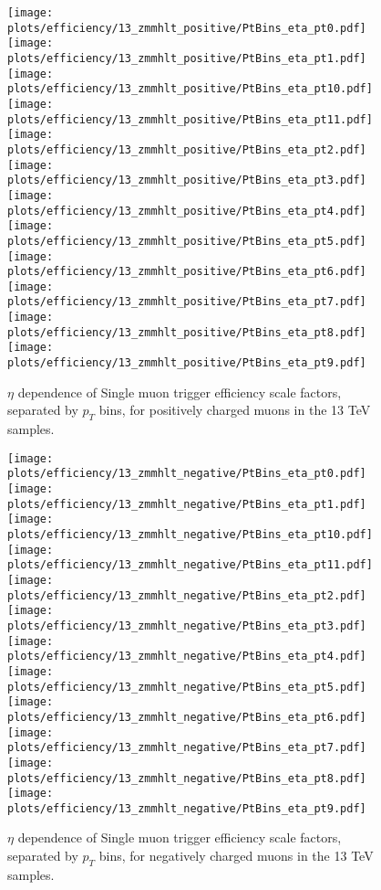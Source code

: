 \begin{figure}
\centering
\texttt{[image: plots/efficiency/13\_zmmhlt\_positive/PtBins\_eta\_pt0.pdf]}
\texttt{[image: plots/efficiency/13\_zmmhlt\_positive/PtBins\_eta\_pt1.pdf]}
\texttt{[image: plots/efficiency/13\_zmmhlt\_positive/PtBins\_eta\_pt10.pdf]}
\texttt{[image: plots/efficiency/13\_zmmhlt\_positive/PtBins\_eta\_pt11.pdf]}
\texttt{[image: plots/efficiency/13\_zmmhlt\_positive/PtBins\_eta\_pt2.pdf]}
\texttt{[image: plots/efficiency/13\_zmmhlt\_positive/PtBins\_eta\_pt3.pdf]}
\texttt{[image: plots/efficiency/13\_zmmhlt\_positive/PtBins\_eta\_pt4.pdf]}
\texttt{[image: plots/efficiency/13\_zmmhlt\_positive/PtBins\_eta\_pt5.pdf]}
\texttt{[image: plots/efficiency/13\_zmmhlt\_positive/PtBins\_eta\_pt6.pdf]}
\texttt{[image: plots/efficiency/13\_zmmhlt\_positive/PtBins\_eta\_pt7.pdf]}
\texttt{[image: plots/efficiency/13\_zmmhlt\_positive/PtBins\_eta\_pt8.pdf]}
\texttt{[image: plots/efficiency/13\_zmmhlt\_positive/PtBins\_eta\_pt9.pdf]}
\caption{$\eta$ dependence of Single muon trigger efficiency scale factors, separated by $p_T$ bins, for positively charged muons in the 13 TeV samples.}
\label{fig:Eff:mu:13:HLT:pos}
\end{figure}
\begin{figure}
\centering
\texttt{[image: plots/efficiency/13\_zmmhlt\_negative/PtBins\_eta\_pt0.pdf]}
\texttt{[image: plots/efficiency/13\_zmmhlt\_negative/PtBins\_eta\_pt1.pdf]}
\texttt{[image: plots/efficiency/13\_zmmhlt\_negative/PtBins\_eta\_pt10.pdf]}
\texttt{[image: plots/efficiency/13\_zmmhlt\_negative/PtBins\_eta\_pt11.pdf]}
\texttt{[image: plots/efficiency/13\_zmmhlt\_negative/PtBins\_eta\_pt2.pdf]}
\texttt{[image: plots/efficiency/13\_zmmhlt\_negative/PtBins\_eta\_pt3.pdf]}
\texttt{[image: plots/efficiency/13\_zmmhlt\_negative/PtBins\_eta\_pt4.pdf]}
\texttt{[image: plots/efficiency/13\_zmmhlt\_negative/PtBins\_eta\_pt5.pdf]}
\texttt{[image: plots/efficiency/13\_zmmhlt\_negative/PtBins\_eta\_pt6.pdf]}
\texttt{[image: plots/efficiency/13\_zmmhlt\_negative/PtBins\_eta\_pt7.pdf]}
\texttt{[image: plots/efficiency/13\_zmmhlt\_negative/PtBins\_eta\_pt8.pdf]}
\texttt{[image: plots/efficiency/13\_zmmhlt\_negative/PtBins\_eta\_pt9.pdf]}
\caption{$\eta$ dependence of Single muon trigger efficiency scale factors, separated by $p_T$ bins, for negatively charged muons in the 13 TeV samples.}
\label{fig:Eff:mu:13:HLT:neg}
\end{figure}
